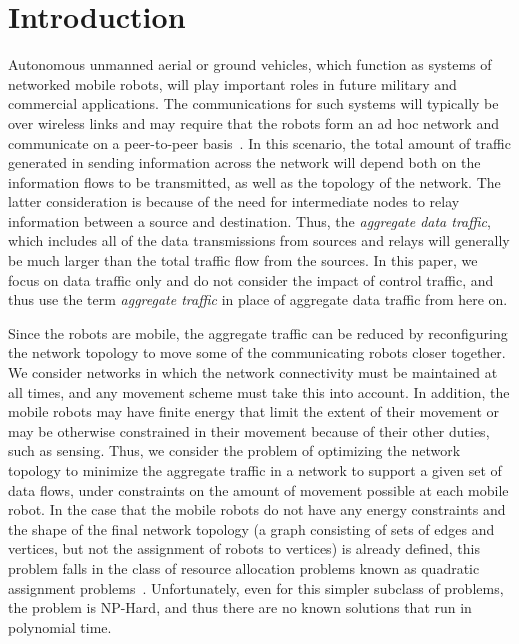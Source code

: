 \documentclass[10pt,conference]{IEEEtran}
\begin{document}
\section{Introduction}\label{sec:intro}

Autonomous unmanned aerial or ground vehicles, which function as
systems of networked mobile robots, will play important roles in
future military and commercial applications. The communications for
such systems will typically be over wireless links and may require
that the robots form an ad hoc network and communicate on a
peer-to-peer basis~\cite{Freeb01,Giu00,Vcom93}. In this scenario, the
total amount of traffic generated in sending information across the
network will depend both on the information flows to be transmitted,
as well as the topology of the network. The latter consideration is
because of the need for intermediate nodes to relay information
between a source and destination.  Thus, the {\it aggregate data
  traffic}, which includes all of the data transmissions from sources
and relays will generally be much larger than the total traffic flow
from the sources.  In this paper, we focus on data traffic only and do
not consider the impact of control traffic, and thus use the term {\it
  aggregate traffic} in place of aggregate data traffic from here on.


Since the robots are mobile, the aggregate traffic can be reduced by
reconfiguring the network topology to move some of the communicating
robots closer together.  We consider networks in which the network
connectivity must be maintained at all times, and any movement scheme
must take this into account.  In addition, the mobile robots may have
finite energy that limit the extent of their movement or may be
otherwise constrained in their movement because of their other duties,
such as sensing.  Thus, we consider the problem of optimizing the
network topology to minimize the aggregate traffic in a network to
support a given set of data flows, under constraints on the amount of
movement possible at each mobile robot.  In the case that the mobile
robots do not have any energy constraints and the shape of the final
network topology (a graph consisting of sets of edges and vertices,
but not the assignment of robots to vertices) is already defined, this
problem falls in the class of resource allocation problems known as
quadratic assignment problems~\cite{CW05,Garey}.  Unfortunately, even
for this simpler subclass of problems, the problem is NP-Hard, and
thus there are no known solutions that run in polynomial time.
\end{document}

